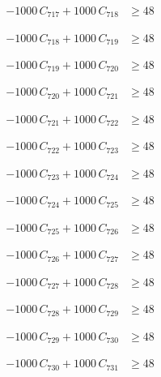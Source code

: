 \documentclass[a4paper,11pt]{article}
\begin{document}
\begin{align}
-1000\,C_{717} + 1000\,C_{718} &\geq 48 \nonumber
\end{align}

\begin{align}
-1000\,C_{718} + 1000\,C_{719} &\geq 48 \nonumber
\end{align}

\begin{align}
-1000\,C_{719} + 1000\,C_{720} &\geq 48 \nonumber
\end{align}

\begin{align}
-1000\,C_{720} + 1000\,C_{721} &\geq 48 \nonumber
\end{align}

\begin{align}
-1000\,C_{721} + 1000\,C_{722} &\geq 48 \nonumber
\end{align}

\begin{align}
-1000\,C_{722} + 1000\,C_{723} &\geq 48 \nonumber
\end{align}

\begin{align}
-1000\,C_{723} + 1000\,C_{724} &\geq 48 \nonumber
\end{align}

\begin{align}
-1000\,C_{724} + 1000\,C_{725} &\geq 48 \nonumber
\end{align}

\begin{align}
-1000\,C_{725} + 1000\,C_{726} &\geq 48 \nonumber
\end{align}

\begin{align}
-1000\,C_{726} + 1000\,C_{727} &\geq 48 \nonumber
\end{align}

\begin{align}
-1000\,C_{727} + 1000\,C_{728} &\geq 48 \nonumber
\end{align}

\begin{align}
-1000\,C_{728} + 1000\,C_{729} &\geq 48 \nonumber
\end{align}

\begin{align}
-1000\,C_{729} + 1000\,C_{730} &\geq 48 \nonumber
\end{align}

\begin{align}
-1000\,C_{730} + 1000\,C_{731} &\geq 48 \nonumber
\end{align}
\end{document}
